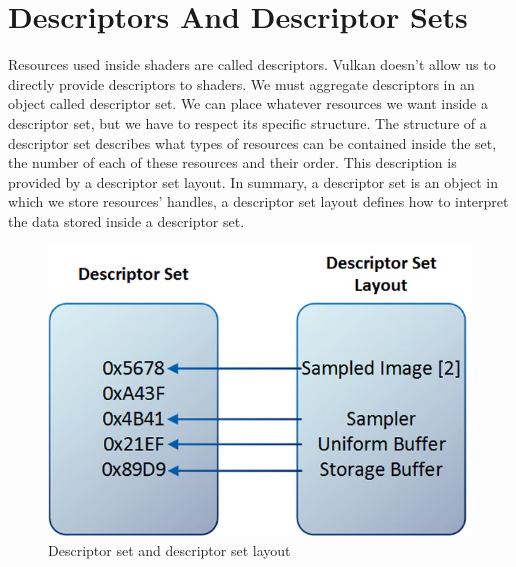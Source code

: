 \section{Descriptors And Descriptor Sets}

Resources used inside shaders are called descriptors.
Vulkan doesn't allow us to directly provide descriptors to shaders.
We must aggregate descriptors in an object called descriptor set.
We can place whatever resources we want inside a descriptor set,
but we have to respect its specific structure.
The structure of a descriptor set describes what types of resources
can be contained inside the set, the number of each of these resources and
their order.
This description is provided by a descriptor set layout.
In summary, a descriptor set is an object in which we store resources' handles,
a descriptor set layout defines how to interpret the data stored inside a
descriptor set.

\begin{figure}[H]
    \centering
    \includegraphics[scale=0.30]{images/ApVulkanConcepts/DescriptorSetAndSetLayout.png}
    \caption{Descriptor set and descriptor set layout}
    \label{fig::DescriptorSetAndSetLaytout}
\end{figure}
